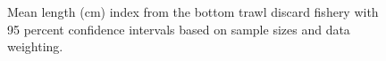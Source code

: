 \documentclass[
]{scrartcl}
\begin{document}
\begin{figure}[H]


\caption{\label{fig-meanlt-btdis}Mean length (cm) index from the bottom
trawl discard fishery with 95 percent confidence intervals based on
sample sizes and data weighting.}

\end{figure}%
\end{document}
